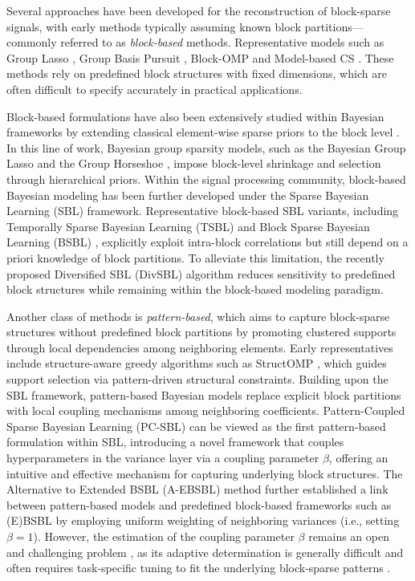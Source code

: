 \documentclass[lettersize,journal]{IEEEtran}
\theoremstyle{remark}
\begin{document}
 
 

Several approaches have been developed for the reconstruction of block-sparse signals, with early methods typically assuming known block partitions—commonly referred to as \textit{block-based} methods. Representative models such as Group Lasso \cite{yuan2006model}, Group Basis Pursuit \cite{van2011sparse}, Block-OMP \cite{eldar2010block} and Model-based CS \cite{baraniuk2010model}. 
These methods rely on predefined block structures with fixed dimensions, which are often difficult to specify accurately in practical applications.


Block-based formulations have also been extensively studied within Bayesian frameworks by extending classical element-wise sparse priors to the block level \cite{park2008bayesian,carvalho2010horseshoe} . In this line of work, Bayesian group sparsity models, such as the Bayesian Group Lasso \cite{raman2009bayesian} and the Group Horseshoe \cite{hernandez2013generalized}, impose block-level shrinkage and selection through hierarchical priors. Within the signal processing community, block-based Bayesian modeling has been further developed under the Sparse Bayesian Learning (SBL) framework. Representative block-based SBL variants, including Temporally Sparse Bayesian Learning (TSBL) \cite{zhang2011sparse} and Block Sparse Bayesian Learning (BSBL) \cite{zhang2013extension}, explicitly exploit intra-block correlations but still depend on a priori knowledge of block partitions. To alleviate this limitation, the recently proposed Diversified SBL (DivSBL) algorithm \cite{NEURIPS2024_ead542f1} reduces sensitivity to predefined block structures while remaining within the block-based modeling paradigm.


Another class of methods is \textit{pattern-based}, which aims to capture block-sparse structures without predefined block partitions by promoting clustered supports through local dependencies among neighboring elements. Early representatives include structure-aware greedy algorithms such as StructOMP \cite{huang2009learning}, which guides support selection via pattern-driven structural constraints.
Building upon the SBL framework, pattern-based Bayesian models replace explicit block partitions with local coupling mechanisms among neighboring coefficients. Pattern-Coupled Sparse Bayesian Learning (PC-SBL) \cite{fang2014pattern} can be viewed as the first pattern-based formulation within SBL,  introducing a novel framework that couples hyperparameters in the variance layer via a coupling parameter $\beta$, offering an intuitive and effective mechanism for capturing underlying block structures. The Alternative to Extended BSBL (A-EBSBL) method \cite{wang2018alternative} further established a link between pattern-based models and predefined block-based frameworks such as (E)BSBL by employing uniform weighting of neighboring variances (i.e., setting $\beta = 1$). However, the estimation of the coupling parameter $\beta$ remains an open and challenging problem \cite{dai2018non}, as its adaptive determination is generally difficult \cite{wang2018alternative, wang2020structured} and often requires task-specific tuning to fit the underlying block-sparse patterns \cite{sant2022block}.
\end{document}
